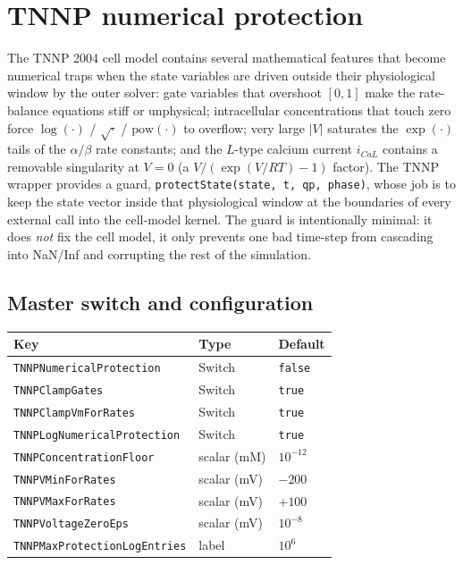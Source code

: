 \documentclass[11pt,a4paper]{article}
\newcommand{\code}[1]{\texttt{\small #1}}
\begin{document}
\section{TNNP numerical protection}
\label{sec:tnnpProtect}

The TNNP 2004 cell model contains several mathematical features that
become numerical traps when the state variables are driven outside
their physiological window by the outer solver: gate variables that
overshoot $[0,1]$ make the rate-balance equations stiff or unphysical;
intracellular concentrations that touch zero force $\log(\cdot)$ /
$\sqrt{\cdot}$ / $\mathrm{pow}(\cdot)$ to overflow; very large $|V|$
saturates the $\exp(\cdot)$ tails of the $\alpha/\beta$ rate constants;
and the $L$-type calcium current $i_{CaL}$ contains a removable
singularity at $V=0$ (a $V/(\exp(V/RT)-1)$ factor). The TNNP wrapper
provides a guard, \code{protectState(state, t, qp, phase)}, whose
job is to keep the state vector inside that physiological window at
the boundaries of every external call into the cell-model kernel. The
guard is intentionally minimal: it does \emph{not} fix the cell model,
it only prevents one bad time-step from cascading into NaN/Inf and
corrupting the rest of the simulation.

\subsection{Master switch and configuration}
\label{sec:tnnp:knobs}

\begin{center}
\begin{tabular}{@{}lll@{}}
\toprule
Key & Type & Default \\
\midrule
\code{TNNPNumericalProtection} & Switch & \code{false} \\
\code{TNNPClampGates} & Switch & \code{true} \\
\code{TNNPClampVmForRates} & Switch & \code{true} \\
\code{TNNPLogNumericalProtection} & Switch & \code{true} \\
\code{TNNPConcentrationFloor} & scalar (mM) & $10^{-12}$ \\
\code{TNNPVMinForRates} & scalar (mV) & $-200$ \\
\code{TNNPVMaxForRates} & scalar (mV) & $+100$ \\
\code{TNNPVoltageZeroEps} & scalar (mV) & $10^{-8}$ \\
\code{TNNPMaxProtectionLogEntries} & label & $10^{6}$ \\
\bottomrule
\end{tabular}
\end{center}
\end{document}
